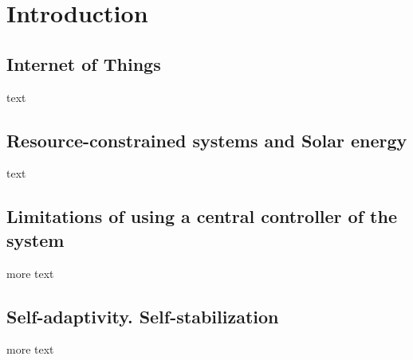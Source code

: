 \documentclass[../main/Self-Stabilization.tex]{subfiles}
\begin{document}
\section{Introduction}

\subsection{Internet of Things}
text
\subsection{Resource-constrained systems and Solar energy}
text
\subsection{Limitations of using a central controller of the system}
more text
\subsection{Self-adaptivity. Self-stabilization}
more text
\end{document}
